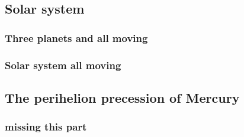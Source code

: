 \subsection{Solar system}


\subsubsection{Three planets and all moving}


\subsubsection{Solar system all moving}














\subsection{The perihelion precession of Mercury}

\subsubsection{missing this part}













